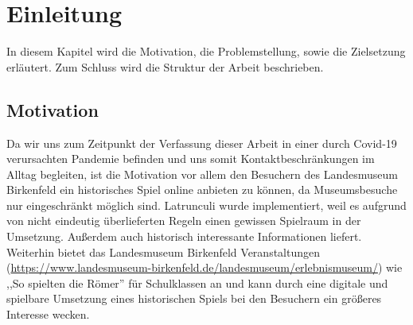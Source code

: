 
\chapter{Einleitung}
\label{ch:Latrunculi}
In diesem Kapitel wird die Motivation, die Problemstellung, sowie die Zielsetzung erläutert. Zum Schluss wird die Struktur der Arbeit beschrieben.



\section{Motivation}
\label{ch:Einleitung:sec:Motivation}
Da wir uns zum Zeitpunkt der Verfassung dieser Arbeit in einer durch Covid-19 verursachten Pandemie befinden und uns somit Kontaktbeschränkungen im Alltag begleiten, ist die Motivation vor allem den Besuchern des Landesmuseum Birkenfeld ein historisches Spiel online anbieten zu können, da Museumsbesuche nur eingeschränkt möglich sind. Latrunculi wurde implementiert, weil es aufgrund von nicht eindeutig überlieferten Regeln einen gewissen Spielraum in der Umsetzung. Außerdem auch historisch interessante Informationen liefert. Weiterhin bietet das Landesmuseum Birkenfeld Veranstaltungen (\url{https://www.landesmuseum-birkenfeld.de/landesmuseum/erlebnismuseum/}) wie ,,So spielten die Römer'' für Schulklassen an und kann durch eine digitale und spielbare Umsetzung  eines historischen Spiels bei den Besuchern ein größeres Interesse wecken.





